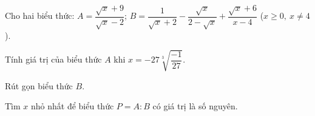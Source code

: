 
\begin{bt}
Cho hai biểu thức: $A=\dfrac{\sqrt{x}+9}{\sqrt{x}-2}$; $B=\dfrac{1}{\sqrt{x}+2}-\dfrac{\sqrt{x}}{2-\sqrt{x}}+\dfrac{\sqrt{x}+6}{x-4}$ ($x\ge 0,\ x\ne 4$).
\begin{cacy}
\item Tính giá trị của biểu thức $A$ khi $x=-27\sqrt[3]{\dfrac{-1}{27}}$.
\item Rút gọn biểu thức $B$.
\item Tìm $x$ nhỏ nhất để biểu thức $P=A:B$ có giá trị là số nguyên.
\end{cacy}
\loigiai{}
\end{bt}
